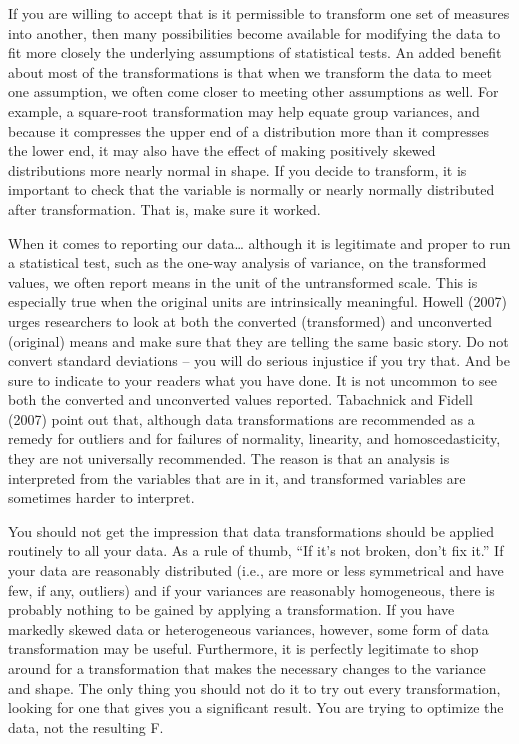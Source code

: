 \documentclass[]{book}
\begin{document}
If you are willing to accept that is it permissible to transform one set of measures into another, then many possibilities become available for modifying the data to fit more closely the underlying assumptions of statistical tests. An added benefit about most of the transformations is that when we transform the data to meet one assumption, we often come closer to meeting other assumptions as well. For example, a square-root transformation may help equate group variances, and because it compresses the upper end of a distribution more than it compresses the lower end, it may also have the effect of making positively skewed distributions more nearly normal in shape. If you decide to transform, it is important to check that the variable is normally or nearly normally distributed after transformation. That is, make sure it worked.

When it comes to reporting our data\ldots{} although it is legitimate and proper to run a statistical test, such as the one-way analysis of variance, on the transformed values, we often report means in the unit of the untransformed scale. This is especially true when the original units are intrinsically meaningful. Howell (2007) urges researchers to look at both the converted (transformed) and unconverted (original) means and make sure that they are telling the same basic story. Do not convert standard deviations -- you will do serious injustice if you try that. And be sure to indicate to your readers what you have done. It is not uncommon to see both the converted and unconverted values reported. Tabachnick and Fidell (2007) point out that, although data transformations are recommended as a remedy for outliers and for failures of normality, linearity, and homoscedasticity, they are not universally recommended. The reason is that an analysis is interpreted from the variables that are in it, and transformed variables are sometimes harder to interpret.

You should not get the impression that data transformations should be applied routinely to all your data. As a rule of thumb, ``If it's not broken, don't fix it.'' If your data are reasonably distributed (i.e., are more or less symmetrical and have few, if any, outliers) and if your variances are reasonably homogeneous, there is probably nothing to be gained by applying a transformation. If you have markedly skewed data or heterogeneous variances, however, some form of data transformation may be useful. Furthermore, it is perfectly legitimate to shop around for a transformation that makes the necessary changes to the variance and shape. The only thing you should not do it to try out every transformation, looking for one that gives you a significant result. You are trying to optimize the data, not the resulting F.
\end{document}
